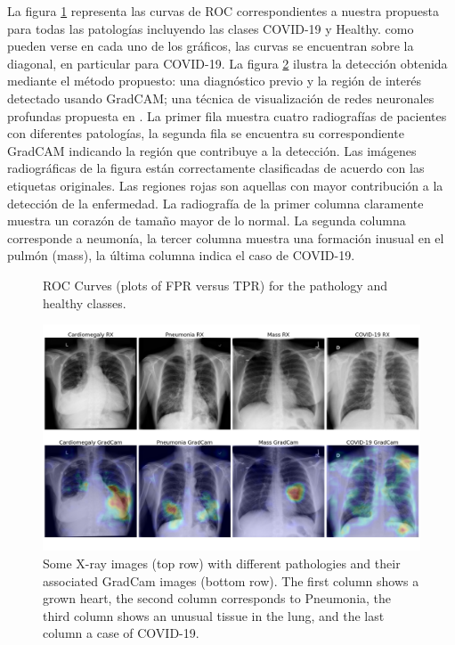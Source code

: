 La figura \ref{roc-curves} representa las curvas de ROC correspondientes a nuestra propuesta para
todas las patologías incluyendo las clases COVID-19 y Healthy. como pueden verse en cada uno de los
gráficos, las curvas se encuentran sobre la diagonal, en particular para COVID-19. La figura
\ref{img-results} ilustra la detección obtenida mediante el método propuesto: una diagnóstico previo
y la región de interés detectado usando GradCAM; una técnica de visualización de redes neuronales
profundas propuesta en \cite{selvaraju2017grad}. La primer fila muestra cuatro radiografías de
pacientes con diferentes patologías, la segunda fila se encuentra su correspondiente GradCAM
indicando la región que contribuye a la detección. Las imágenes radiográficas de la figura están
correctamente clasificadas de acuerdo con las etiquetas originales. Las regiones rojas son aquellas
con mayor contribución a la detección de la enfermedad. La radiografía de la primer columna claramente
muestra un corazón de tamaño mayor de lo normal. La segunda columna corresponde a neumonía, la
tercer columna muestra una formación inusual en el pulmón (mass), la última columna indica el caso
de COVID-19.

\begin{figure}
    \begin{center}
        \scalebox{0.6}{}
    \end{center}
    \caption{ROC Curves (plots of FPR versus TPR) for the pathology and healthy classes.}
    \label{roc-curves}
\end{figure}

\begin{figure}[ht!]
    \centering
    \includegraphics[width=0.8 \textwidth]{Chapters/4. ViT-Lung/images/vlgrid.png}
    \caption{Some X-ray images (top row) with different pathologies and their associated GradCam images
         (bottom row). The first column shows a grown heart, the second column corresponds to
         Pneumonia, the third column shows an unusual tissue in the lung, and the last column a case
         of COVID-19.}
    \label{img-results}
\end{figure}
